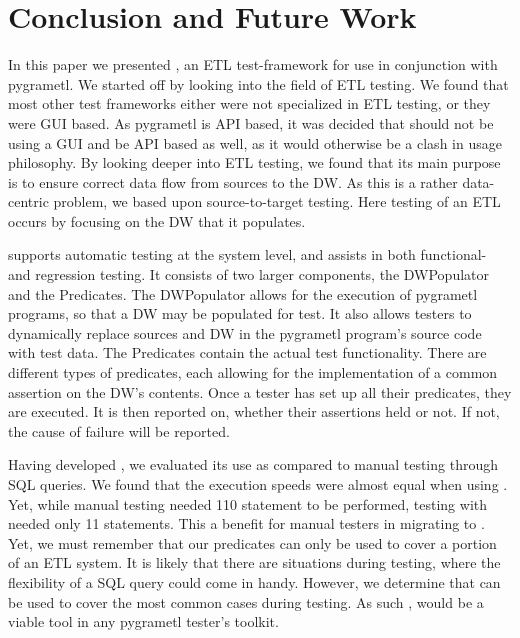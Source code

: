 \section{Conclusion and Future Work}\label{sect:conc}

In this paper we presented \FW{}, an ETL test-framework for use in conjunction with pygrametl. We started off by looking into the field of ETL testing. We found that most other test frameworks either were not specialized in ETL testing, or they were GUI based. As pygrametl is API based, it was decided that \FW{} should not be using a GUI and be API based as well, as it would otherwise be a clash in usage philosophy. By looking deeper into ETL testing, we found that its main purpose is to ensure correct data flow from sources to the DW. As this is a rather data-centric problem, we based \FW{} upon source-to-target testing. Here testing of an ETL occurs by focusing on the DW that it populates.

\FW{} supports automatic testing at the system level, and assists in both functional- and regression testing. It consists of two larger components, the DWPopulator and the Predicates. The DWPopulator allows for the execution of pygrametl programs, so that a DW may be populated for test. It also allows testers to dynamically replace sources and DW in the pygrametl program’s source code with test data. The Predicates contain the actual test functionality. There are different types of predicates, each allowing for the implementation of a common assertion on the DW’s contents. Once a tester has set up all their predicates, they are executed. It is then reported on, whether their assertions held or not. If not, the cause of failure will be reported.

Having developed \FW{}, we evaluated its use as compared to manual testing through SQL queries. We found that the execution speeds were almost equal when using \FW{}. Yet, while manual testing needed 110 statement to be performed, testing with \FW{} needed only 11 statements. This a benefit for manual testers in migrating to \FW{}. Yet, we must remember that our predicates can only be used to cover a portion of an ETL system. It is likely that there are situations during testing, where the flexibility of a SQL query could come in handy. However, we determine that \FW{} can be used to cover the most common cases during testing. As such \FW{}, would be a viable tool in any pygrametl tester’s toolkit.

